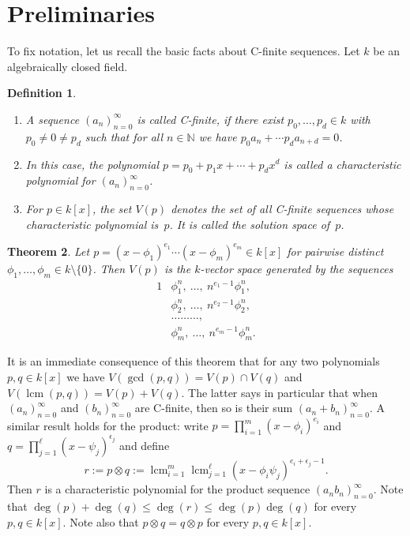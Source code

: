 \documentclass{sig-alternate}
\newtheorem{theorem}{Theorem}
\newtheorem{defi}[theorem]{Definition}
\let\set\mathbb
\def\lcm{\operatorname{lcm}}
\begin{document}
\section{Preliminaries}

To fix notation, let us recall the basic facts about C-finite sequences.
Let $k$ be an algebraically closed field. 

\begin{defi}
  \begin{enumerate}
  \item A sequence $(a_n)_{n=0}^\infty$ is called \emph{C-finite,} if there exist
    $p_0,\dots,p_d\in k$ with $p_0\neq0\neq p_d$ such that for all $n\in\set N$ we have
    $p_0a_n + \cdots p_da_{n+d}=0$.
  \item In this case, the polynomial $p=p_0+p_1x+\cdots+p_dx^d$ is called a
    \emph{characteristic polynomial} for $(a_n)_{n=0}^\infty$.
  \item For $p\in k[x]$, the set $V(p)$ denotes the set of all C-finite sequences
    whose characteristic polynomial is~$p$. It is called the \emph{solution space}
    of~$p$.
  \end{enumerate}  
\end{defi}

\begin{theorem}\cite{stanley99,kauers10j}\label{thm:main}
  Let
  $p=(x-\phi_1)^{e_1}\cdots(x-\phi_m)^{e_m}\in k[x]$
  for pairwise distinct $\phi_1,\dots,\phi_m\in k\setminus\{0\}$. Then $V(p)$
  is the $k$-vector space generated by the sequences
  \begin{alignat*}1
    &\phi_1^n,\ \dots,\ n^{e_1-1}\phi_1^n,\\
    &\phi_2^n,\ \dots,\ n^{e_2-1}\phi_2^n,\\
    &\dots\dots\dots,\\
    &\phi_m^n,\ \dots,\ n^{e_m-1}\phi_m^n.
  \end{alignat*}
\end{theorem}

It is an immediate consequence of this theorem that for any two polynomials $p,q\in k[x]$
we have $V(\gcd(p,q))=V(p)\cap V(q)$ and $V(\lcm(p,q))=V(p)+V(q)$. The latter says in
particular that when $(a_n)_{n=0}^\infty$ and $(b_n)_{n=0}^\infty$ are C-finite, then so is
their sum $(a_n+b_n)_{n=0}^\infty$. A similar result holds for the product: write
$p=\prod_{i=1}^m (x-\phi_i)^{e_i}$ and $q=\prod_{j=1}^\ell (x-\psi_j)^{\epsilon_j}$ and define
\begin{equation}\label{eq:1}
  r:=p\otimes q:=\lcm_{i=1}^m\lcm_{j=1}^\ell (x-\phi_i\psi_j)^{e_i+\epsilon_j-1}.
\end{equation}
Then $r$ is a characteristic polynomial for the product sequence $(a_nb_n)_{n=0}^\infty$.
Note that $\deg(p)+\deg(q)\leq\deg(r)\leq\deg(p)\deg(q)$ for every $p,q\in k[x]$.
Note also that $p\otimes q=q\otimes p$ for every $p,q\in k[x]$.
\end{document}
